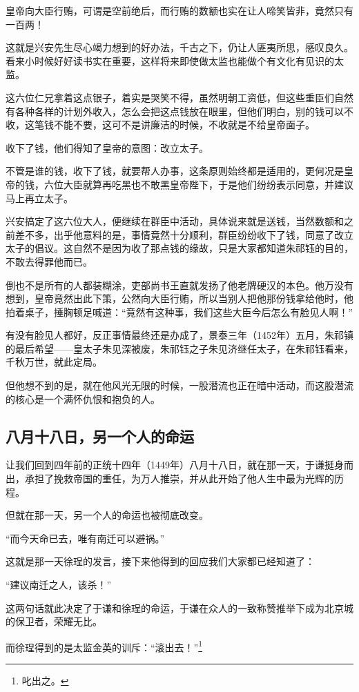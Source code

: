 \begin{multicols}{\theparacolNo}
皇帝向大臣行贿，可谓是空前绝后，而行贿的数额也实在让人啼笑皆非，竟然只有一百两！

这就是兴安先生尽心竭力想到的好办法，千古之下，仍让人匪夷所思，感叹良久。看来小时候好好读书实在重要，这样将来即使做太监也能做个有文化有见识的太监。

这六位仁兄拿着这点银子，着实是哭笑不得，虽然明朝工资低，但这些重臣们自然有各种各样的计划外收入，怎么会把这点钱放在眼里，但他们明白，别的钱可以不收，这笔钱不能不要，这可不是讲廉洁的时候，不收就是不给皇帝面子。

收下了钱，他们得知了皇帝的意图：改立太子。

不管是谁的钱，收下了钱，就要帮人办事，这条原则始终都是适用的，更何况是皇帝的钱，六位大臣就算再吃黑也不敢黑皇帝陛下，于是他们纷纷表示同意，并建议马上再立太子。

兴安搞定了这六位大人，便继续在群臣中活动，具体说来就是送钱，当然数额和之前差不多，出乎他意料的是，事情竟然十分顺利，群臣纷纷收下了钱，同意了改立太子的倡议。这自然不是因为收了那点钱的缘故，只是大家都知道朱祁钰的目的，不敢去得罪他而已。

倒也不是所有的人都装糊涂，吏部尚书王直就发扬了他老牌硬汉的本色。他万没有想到，皇帝竟然出此下策，公然向大臣行贿，所以当别人把他那份钱拿给他时，他拍着桌子，捶胸顿足喊道：“竟然有这种事，我们这些大臣今后怎么有脸见人啊！”

有没有脸见人都好，反正事情最终还是办成了，景泰三年（1452年）五月，朱祁镇的最后希望——皇太子朱见深被废，朱祁钰之子朱见济继任太子，在朱祁钰看来，千秋万世，就此定局。

但他想不到的是，就在他风光无限的时候，一股潜流也正在暗中活动，而这股潜流的核心是一个满怀仇恨和抱负的人。

\subsection{八月十八日，另一个人的命运}
让我们回到四年前的正统十四年（1449年）八月十八日，就在那一天，于谦挺身而出，承担了挽救帝国的重任，为万人推崇，并从此开始了他人生中最为光辉的历程。

但就在那一天，另一个人的命运也被彻底改变。

“而今天命已去，唯有南迁可以避祸。”

这就是那一天徐珵的发言，接下来他得到的回应我们大家都已经知道了：

“建议南迁之人，该杀！”

这两句话就此决定了于谦和徐珵的命运，于谦在众人的一致称赞推举下成为北京城的保卫者，荣耀无比。

而徐珵得到的是太监金英的训斥：“滚出去！”\footnote{叱出之。}


\end{multicols}
